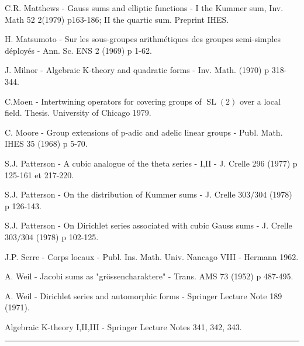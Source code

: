 \documentclass[10pt,a4paper]{article}
\begin{document}
\clearpage
{}
\label{d035-physical-034}
\par [13] C.R. Matthews - Gauss sums and elliptic functions - I the Kummer sum, Inv. Math 52 2(1979) p163-186; II the quartic sum. Preprint IHES.\par
\par [14] H. Matsumoto - Sur les sous-groupes arithmétiques des groupes semi-simples déployés - Ann. Sc. ENS 2 (1969) p 1-62.\par
\par [15] J. Milnor - Algebraic K-theory and quadratic forms - Inv. Math. (1970) p 318-344.\par
\par [16] C.Moen - Intertwining operators for covering groups of $\operatorname{SL}(2)$ over a local field. Thesis. University of Chicago 1979.\par
\par [17] C. Moore - Group extensions of p-adic and adelic linear groups - Publ. Math. IHES 35 (1968) p 5-70.\par
\par [18] S.J. Patterson - A cubic analogue of the theta series - I,II - J. Crelle 296 (1977) p 125-161 et 217-220.\par
\par [19] S.J. Patterson - On the distribution of Kummer sums - J. Crelle $303/304$ (1978) p 126-143.\par
\par [20] S.J. Patterson - On Dirichlet series associated with cubic Gauss sums - J. Crelle $303/304$ (1978) p 102-125.\par
\par [21] J.P. Serre - Corps locaux - Publ. Ins. Math. Univ. Nancago VIII - Hermann 1962.\par
\par [22] A. Weil - Jacobi sums as "grössencharaktere" - Trans. AMS 73 (1952) p 487-495.\par
\par [23] A. Weil - Dirichlet series and automorphic forms - Springer Lecture Note 189 (1971).\par
\par [24] Algebraic K-theory I,II,III - Springer Lecture Notes 341, 342, 343.\par
\par\medskip\hrule\medskip
\end{document}
